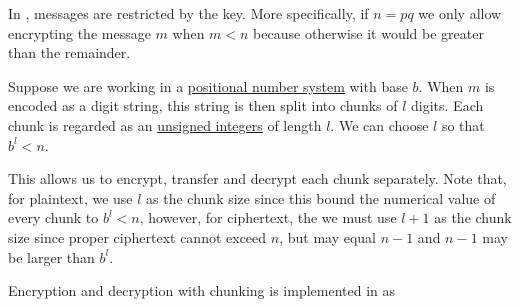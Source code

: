 \begin{remark}\label{rem:digit_string_chunking}
  In , messages are restricted by the key. More specifically, if \( n = pq \) we only allow encrypting the message \( m \) when \( m < n \) because otherwise it would be greater than the remainder.

  Suppose we are working in a \hyperref[def:positional_number_system]{positional number system} with base \( b \). When \( m \) is encoded as a digit string, this string is then split into chunks of \( l \) digits. Each chunk is regarded as an \hyperref[def:ring_of_unsigned_integers]{unsigned integers} of length \( l \). We can choose \( l \) so that \( b^l < n \).

  This allows us to encrypt, transfer and decrypt each chunk separately. Note that, for plaintext, we use \( l \) as the chunk size since this bound the numerical value of every chunk to \( b^l < n \), however, for ciphertext, the we must use \( l + 1 \) as the chunk size since proper ciphertext cannot exceed \( n \), but may equal \( n - 1 \) and \( n - 1 \) may be larger than \( b^l \).

  Encryption and decryption with chunking is implemented in \cite{notebook:code} as
  \begin{CodeRefDisplay}
     \\
  \end{CodeRefDisplay}
\end{remark}
